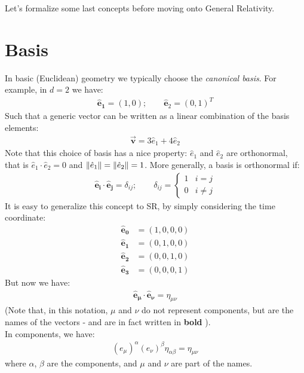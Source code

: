 \documentclass[../template.tex]{subfiles}
\begin{document}
Let's formalize some last concepts before moving onto General Relativity.
\section{Basis}
In basic (Euclidean) geometry we typically choose the \textit{canonical basis}. For example, in $d=2$ we have:
\begin{align*}
    \bm{\hat{e}_1} = (1,0); \qquad \bm{\hat{e}}_2 = (0,1)^T
\end{align*}
Such that a generic vector can be written as a linear combination of the basis elements:
\begin{align*}
    \bm{\vec{v}} = 3 \hat{e}_1 + 4 \hat{e}_2
\end{align*} 
Note that this choice of basis has a nice property: $\hat{e}_1$ and $\hat{e}_2$ are orthonormal, that is $\hat{e}_1 \cdot \hat{e}_2 = 0$ and $\norm{\hat{e}_1} = \norm{\hat{e}_2} = 1$. More generally, a basis is orthonormal if:
\begin{align*}
    \bm{\hat{e}_i} \cdot \bm{\hat{e}_j} = \delta_{ij}; \qquad \delta_{ij} = \begin{cases}
        1 & i = j\\
        0 & i \neq j
    \end{cases}
\end{align*}  
It is easy to generalize this concept to SR, by simply considering the time coordinate:
\begin{align*}
    \bm{\hat{e}_0} &= (1,0,0,0) \\
    \bm{\hat{e}_1} &= (0,1,0,0) \\
    \bm{\hat{e}_2} &= (0,0,1,0) \\
    \bm{\hat{e}_3} &= (0,0,0,1)
\end{align*}
But now we have:
\begin{align*}
    \bm{\hat{e}_\mu} \cdot \bm{\hat{e}_\nu} = \eta_{\mu \nu}
\end{align*}
(Note that, in this notation, $\mu$ and $\nu$ do not represent components, but are the names of the vectors - and are in fact written in \textbf{bold} ).\\

In components, we have:
\begin{align*}
    (e_\mu)^\alpha (e_\nu)^\beta \eta_{\alpha \beta} = \eta_{\mu \nu}
\end{align*}
where $\alpha$, $\beta$ are the components, and $\mu$ and $\nu$ are part of the names.
\end{document}
